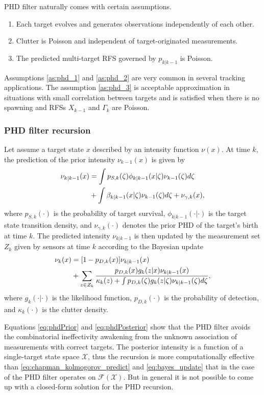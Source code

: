 PHD filter naturally comes with certain assumptions.
\begin{enumerate}
    \item Each target evolves and generates observations independently of each other. \label{as:phd_1}
    \item Clutter is Poisson and independent of target-originated measurements. \label{as:phd_2}
    \item The predicted multi-target RFS governed by $p_{k|k-1}$ is Poisson. \label{as:phd_3}
\end{enumerate}

Assumptions \ref{as:phd_1} and \ref{as:phd_2} are very common in several tracking applications. The assumption \ref{as:phd_3} is acceptable approximation in situations with small correlation between targets and is satisfied when
there is no spawning and RFSs $X_{k-1}$ and $\Gamma_k$ are Poisson.

            \subsubsection{PHD filter recursion}
Let assume a target state $x$ described by an intensity function $\nu(x)$. At time $k$, the prediction of the prior intensity $\nu_{k-1}(x)$ is given by
\begin{align}
    \nu_{k|k-1}(x) &= \int p_{S,k}(\zeta)\phi_{k|k-1}(x|\zeta)\nu_{k-1}(\zeta)d\zeta \notag \\
        &+ \int \beta_{k|k-1}(x|\zeta) \nu_{k-1}(\zeta)d\zeta + \nu_{\gamma,k}(x),
    \label{eq:phdPrior}
\end{align}
where $p_{S,k}(\cdot)$ is the probability of target survival, $\phi_{k|k-1}(\cdot|\cdot)$ is the target state
transition density, and $\nu_{\gamma,k}(\cdot)$ denotes the prior PHD of the target's birth at time $k$.
The predicted intensity $\nu_{k|k-1}$ is then updated by the measurement set $Z_k$ given by sensors at time $k$ according to the Bayesian update
\begin{align}
        \nu_k(x) &= [1 - p_{D,k}(x)]\nu_{k|k-1}(x) \notag \\
        &+ \sum_{z \in Z_k}\frac{p_{D,k}(x) g_k(z|x) \nu_{k|k-1}(x)}{\kappa_k(z) + \int p_{D,k}(\zeta) g_k(z|\zeta) \nu_{k|k-1}(\zeta)d\zeta}, \label{eq:phdPosterior}
\end{align}
where $g_k(\cdot|\cdot)$ is the likelihood function, $p_{D,k}(\cdot)$ is the probability of detection, and $\kappa_k(\cdot)$ is the clutter density.

Equations \eqref{eq:phdPrior} and \eqref{eq:phdPosterior} show that the PHD filter avoids the combinatorial
ineffectivity awakening from the unknown association of measurements with correct targets. The posterior intensity is
a function of a single-target state space $\mathcal{X}$, thus the recursion is more computationally effective than \eqref{eq:chapman_kolmogorov_predict} and \eqref{eq:bayes_update} that in the case of the PHD filter operates on $\mathcal{F(X)}$. But in general it is not possible to come up with a closed-form solution for the PHD recursion.

